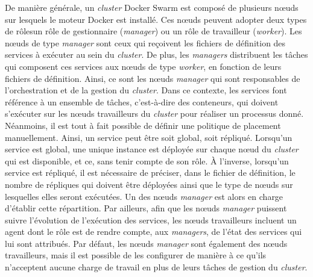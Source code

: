 De manière générale, un \textit{cluster} Docker Swarm est composé de plusieurs n\oe{}uds sur lesquels le moteur Docker est installé. Ces n\oe{}uds peuvent adopter deux types de rôles\textemdash un rôle de gestionnaire (\textit{manager}) ou un rôle de travailleur (\textit{worker}). Les n\oe{}uds de type \textit{manager} sont ceux qui reçoivent les fichiers de définition des services à exécuter au sein du \textit{cluster}. De plus, les \textit{managers} distribuent les tâches qui composent ces services aux n\oe{}uds de type \textit{worker}, en fonction de leurs fichiers de définition. Ainsi, ce sont les n\oe{}uds \textit{manager} qui sont responsables de l'orchestration et de la gestion du \textit{cluster}. Dans ce contexte, les services font référence à un ensemble de tâches, c'est-à-dire des conteneurs, qui doivent s'exécuter sur les n\oe{}uds travailleurs du \textit{cluster} pour réaliser un processus donné. Néanmoins, il est tout à fait possible de définir une politique de placement manuellement. Ainsi, un service peut être soit global, soit répliqué. Lorsqu'un service est global, une unique instance est déployée sur chaque n\oe{}ud du \textit{cluster} qui est disponible, et ce, sans tenir compte de son rôle.  À l'inverse, lorsqu'un service est répliqué, il est nécessaire de préciser, dans le fichier de définition, le nombre de répliques qui doivent être déployées ainsi que le type de n\oe{}uds sur lesquelles elles seront exécutées. Un des n\oe{}uds \textit{manager} est alors en charge d'établir cette répartition. Par ailleurs, afin que les n\oe{}uds \textit{manager} puissent suivre l'évolution de l'exécution des services, les n\oe{}uds travailleurs incluent un agent dont le rôle est de rendre compte, aux \textit{managers}, de l'état des services qui lui sont attribués. Par défaut, les n\oe{}uds \textit{manager} sont également des n\oe{}uds travailleurs, mais il est possible de les configurer de manière à ce qu'ils n'acceptent aucune charge de travail en plus de leurs tâches de gestion du \textit{cluster}.


